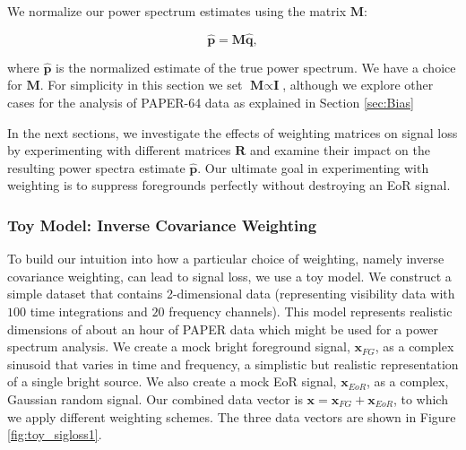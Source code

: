 \documentclass[preprint2,numberedappendix,tighten]{aastex6}  %
\begin{document}
We normalize our power spectrum estimates using the matrix $\textbf{M}$:

\begin{equation}
\label{eq:phat}
\hat{\textbf{p}} = \textbf{M}\hat{\textbf{q}},
\end{equation}

\noindent where $\hat{\textbf{p}}$ is the normalized estimate of the true power spectrum. We have a choice for $\textbf{M}$. For simplicity in this section we set $\textbf{M} \propto \textbf{I}$, although we explore other cases for the analysis of PAPER-64 data as explained in Section \ref{sec:Bias}

In the next sections, we investigate the effects of weighting matrices on signal loss by experimenting with different matrices $\textbf{R}$ and examine their impact on the resulting power spectra estimate $\hat{\textbf{p}}$. Our ultimate goal in experimenting with weighting is to suppress foregrounds perfectly without destroying an EoR signal.

\subsubsection{Toy Model: Inverse Covariance Weighting}
\label{sec:toymodel}

To build our intuition into how a particular choice of weighting, namely inverse covariance weighting, can lead to signal loss, we use a toy model. We construct a simple dataset that contains 2-dimensional data (representing visibility data with $100$ time integrations and $20$ frequency channels). This model represents realistic dimensions of about an hour of PAPER data which might be used for a power spectrum analysis. We create a mock bright foreground signal, $\textbf{x}_{FG}$, as a complex sinusoid that varies in time and frequency, a simplistic but realistic representation of a single bright source. We also create a mock EoR signal, $\textbf{x}_{EoR}$, as a complex, Gaussian random signal. Our combined data vector is $\textbf{x} = \textbf{x}_{FG} + \textbf{x}_{EoR}$, to which we apply different weighting schemes. The three data vectors are shown in Figure \ref{fig:toy_sigloss1}. 
\end{document}
